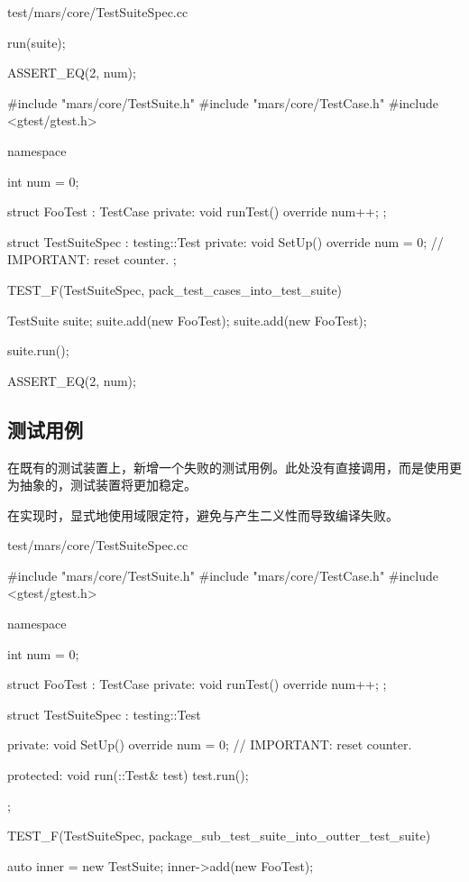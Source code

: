 \begin{content}
\begin{diff}{test/mars/core/TestSuiteSpec.cc}
\begin{minicpp}
{  run(suite);

  ASSERT_EQ(2, num);
}
 \end{minicpp}
\tcblower
 \begin{minicpp}
#include "mars/core/TestSuite.h"
#include "mars/core/TestCase.h"
#include <gtest/gtest.h>

namespace {
  int num = 0;

  struct FooTest : TestCase {
  private:
    void runTest() override {
      num++;
    }
  };

  struct TestSuiteSpec : testing::Test {
  private:
    void SetUp() override {
      num = 0;  // IMPORTANT: reset counter.
    }
  };
}

TEST_F(TestSuiteSpec, pack_test_cases_into_test_suite) {
  TestSuite suite;
  suite.add(new FooTest);
  suite.add(new FooTest);

  suite.run();

  ASSERT_EQ(2, num);
}
 \end{minicpp}
\end{diff}

\subsection{测试用例}

在既有的测试装置上，新增一个失败的测试用例。此处没有直接调用，而是使用更为抽象的，测试装置将更加稳定。

在实现时，显式地使用域限定符，避免与产生二义性而导致编译失败。

\begin{nodiff}{test/mars/core/TestSuiteSpec.cc}
 \begin{c++}
#include "mars/core/TestSuite.h"
#include "mars/core/TestCase.h"
#include <gtest/gtest.h>

namespace {
  int num = 0;

  struct FooTest : TestCase {
  private:
    void runTest() override {
      num++;
    }
  };

  struct TestSuiteSpec : testing::Test {
  private:
    void SetUp() override {
      num = 0;  // IMPORTANT: reset counter.
    }

  protected:
    void run(::Test& test) {
      test.run();
    }
  };
}

TEST_F(TestSuiteSpec, package_sub_test_suite_into_outter_test_suite) {
  auto inner = new TestSuite;
  inner->add(new FooTest);

}
\end{c++}
\end{nodiff}
\end{content}
